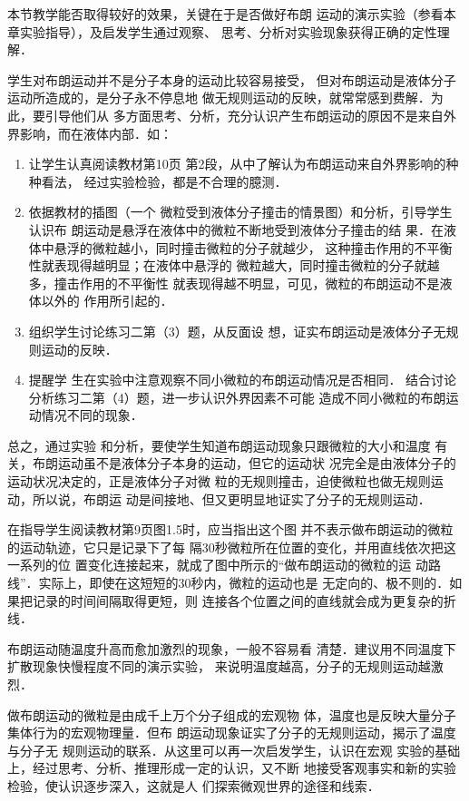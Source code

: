 本节教学能否取得较好的效果，关键在于是否做好布朗
运动的演示实验（参看本章实验指导），及启发学生通过观察、
思考、分析对实验现象获得正确的定性理解．

学生对布朗运动并不是分子本身的运动比较容易接受，
但对布朗运动是液体分子运动所造成的，是分子永不停息地
做无规则运动的反映，就常常感到费解．为此，要引导他们从
多方面思考、分析，充分认识产生布朗运动的原因不是来自外
界影响，而在液体内部．如：
\begin{enumerate}
\item 让学生认真阅读教材第10页
第2段，从中了解认为布朗运动来自外界影响的种种看法，
经过实验检验，都是不合理的臆测．    \item 依据教材的插图（一个
微粒受到液体分子撞击的情景图）和分析，引导学生认识布
朗运动是悬浮在液体中的微粒不断地受到液体分子撞击的结
果．在液体中悬浮的微粒越小，同时撞击微粒的分子就越少，
这种撞击作用的不平衡性就表现得越明显；在液体中悬浮的
微粒越大，同时撞击微粒的分子就越多，撞击作用的不平衡性
就表现得越不明显，可见，微粒的布朗运动不是液体以外的
作用所引起的．    \item 组织学生讨论练习二第（3）题，从反面设
想，证实布朗运动是液体分子无规则运动的反映．    \item 提醒学
生在实验中注意观察不同小微粒的布朗运动情况是否相同． 结合讨论分析练习二第（4）题，进一步认识外界因素不可能
造成不同小微粒的布朗运动情况不同的现象．
\end{enumerate}

总之，通过实验
和分析，要使学生知道布朗运动现象只跟微粒的大小和温度
有关，布朗运动虽不是液体分子本身的运动，但它的运动状
况完全是由液体分子的运动状况决定的，正是液体分子对微
粒的无规则撞击，迫使微粒也做无规则运动，所以说，布朗运
动是间接地、但又更明显地证实了分子的无规则运动．

在指导学生阅读教材第9页图1.5时，应当指出这个图
并不表示做布朗运动的微粒的运动轨迹，它只是记录下了每
隔30秒微粒所在位置的变化，并用直线依次把这一系列的位
置变化连接起来，就成了图中所示的“做布朗运动的微粒的运
动路线”．实际上，即使在这短短的30秒内，微粒的运动也是
无定向的、极不则的．如果把记录的时间间隔取得更短，则
连接各个位置之间的直线就会成为更复杂的折线．

布朗运动随温度升高而愈加激烈的现象，一般不容易看
清楚．建议用不同温度下扩散现象快慢程度不同的演示实验，
来说明温度越高，分子的无规则运动越激烈．

做布朗运动的微粒是由成千上万个分子组成的宏观物
体，温度也是反映大量分子集体行为的宏观物理量．但布
朗运动现象证实了分子的无规则运动，揭示了温度与分子无
规则运动的联系．从这里可以再一次启发学生，认识在宏观
实验的基础上，经过思考、分析、推理形成一定的认识，又不断
地接受客观事实和新的实验检验，使认识逐步深入，这就是人
们探索微观世界的途径和线索．

